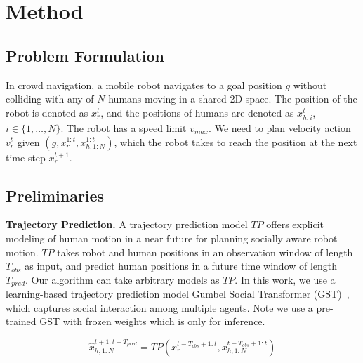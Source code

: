 \section{Method}\label{sec-method}

\subsection{Problem Formulation}

In crowd navigation, a mobile robot navigates to a goal position $g$ without colliding with any of $N$ humans moving in a shared 2D space. The position of the robot is denoted as $x_r^t$, and the positions of humans are denoted as $x_{h,i}^t$, $i\!\in\!\{1, \ldots, N\}$. The robot has a speed limit $v_{max}$. We need to plan velocity action $v_r^t$ given $\left(g, x_r^{1:t}, x_{h,1:N}^{1:t}\right)$, which the robot takes to reach the position at the next time step $x_r^{t+1}$.

\subsection{Preliminaries}

\textbf{Trajectory Prediction.} A trajectory prediction model $TP$ offers explicit modeling of human motion in a near future for planning socially aware robot motion. $TP$ takes robot and human positions in an observation window of length $T_{obs}$ as input, and predict human positions in a future time window of length $T_{pred}$. Our algorithm can take arbitrary models as $TP$. In this work, we use a learning-based trajectory prediction model Gumbel Social Transformer (GST)~\cite{huang2022learning}, which captures social interaction among multiple agents. Note we use a pre-trained GST with frozen weights which is only for inference.

\begin{equation}
    \hat{x}_{h,1:N}^{t+1:t+T_{pred}} = TP\left(x_r^{t-T_{obs}+1:t}, x_{h,1:N}^{t-T_{obs}+1:t}\right)
\end{equation}

